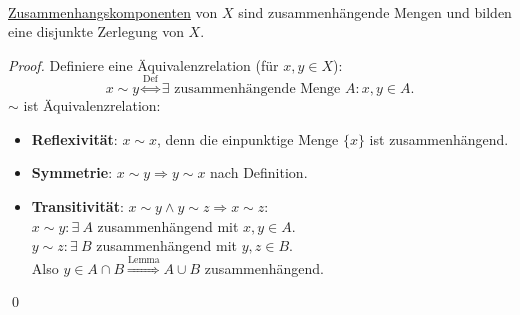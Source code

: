 \begin{remark}
  \  \\ \hyperref[def:zusammenhangskomponente]{Zusammenhangskomponenten} von \( X \) sind zusammenhängende Mengen und bilden eine disjunkte Zerlegung von \( X \).
  \begin{proof}
    Definiere eine Äquivalenzrelation (für \( x, y \in X \)):
    \begin{equation*}
      x \sim y \overset{\text{Def}}{\Leftrightarrow} \exists \text{ zusammenhängende Menge } A : x, y \in A\text{.}
    \end{equation*}
    \( \sim \) ist Äquivalenzrelation:
    \begin{itemize}
      \item \textbf{Reflexivität}: \( x \sim x \), denn die einpunktige Menge \( \{ x \} \) ist zusammenhängend. 
      \item \textbf{Symmetrie}: \( x \sim y \Rightarrow y \sim x \) nach Definition.
      \item \textbf{Transitivität}: \( x \sim y \wedge y \sim z \Rightarrow x \sim z \): \\
        \( x \sim y: \exists \ A \) zusammenhängend mit \( x,y \in A \). \\
        \( y \sim z: \exists \ B \) zusammenhängend mit \( y,z \in B \). \\
        Also \( y \in A \cap B \overset{\text{Lemma}}{\Rightarrow} A \cup B \) zusammenhängend.
    \end{itemize}
    \qed{}
  \end{proof}
\end{remark}

